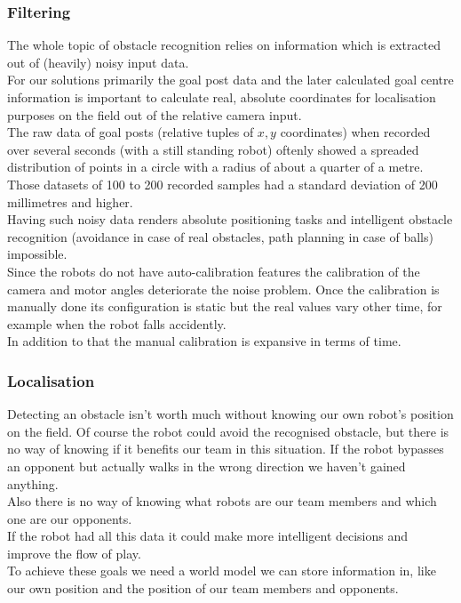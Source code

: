 \documentclass[lnicst,a4paper]{svmultln}
\begin{document}
\subsubsection{Filtering}
The whole topic of obstacle recognition relies on information which is extracted out of (heavily) noisy input data.
\\
For our solutions primarily the goal post data and the later calculated goal centre information is important to calculate real, absolute coordinates for localisation purposes on the field out of the relative camera input.
\\
The raw data of goal posts (relative tuples of $x, y$ coordinates) when recorded over several seconds (with a still standing robot) oftenly showed a spreaded distribution of points in a circle with a radius of about a quarter of a metre. Those datasets of 100 to 200 recorded samples had a standard deviation of 200 millimetres and higher.
\\
Having such noisy data renders absolute positioning tasks and intelligent obstacle recognition (avoidance in case of real obstacles, path planning in case of balls) impossible.
\\
Since the robots do not have auto-calibration features the calibration of the camera and motor angles deteriorate the noise problem. Once the calibration is manually done its configuration is static but the real values vary other time, for example when the robot falls accidently.
\\
In addition to that the manual calibration is expansive in terms of time.


\subsubsection{Localisation}
Detecting an obstacle isn't worth much without knowing our own robot's position on the field. Of course the robot could avoid the recognised obstacle, but there is no way of knowing if it benefits our team in this situation. If the robot bypasses an opponent but actually walks in the wrong direction we haven't gained anything. 
\\
Also there is no way of knowing what robots are our team members and which one are our opponents.
\\
If the robot had all this data it could make more intelligent decisions and improve the flow of play.
\\
To achieve these goals we need a world model we can store information in, like our own position and the position of our team members and opponents.
\end{document}
